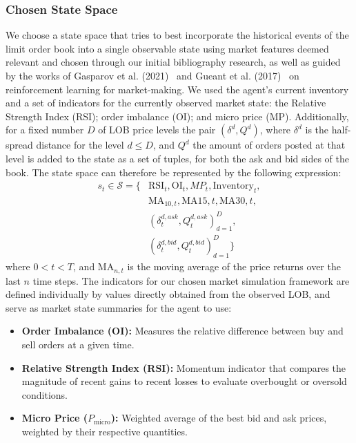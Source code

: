 \subsubsection{Chosen State Space}
We choose a state space that tries to best incorporate the historical events of the limit order book into a single observable state using
market features deemed relevant and chosen through our initial bibliography research,
as well as guided by the works of
Gasparov et al. (2021)~\cite{Gasperov2021} and Gueant et al. (2017)~\cite{Gueant2017} on reinforcement learning for market-making.
We used the agent's current inventory and a set of indicators for the currently observed market state:
the Relative Strength Index (RSI); order imbalance (OI); and micro price (MP).
Additionally, for a fixed number $D$ of LOB price levels the pair $(\delta^d, Q^d)$, where $\delta^d$ is the half-spread distance for the level $d \leq D$,
and $Q^d$ the amount of orders posted at that level is added to the state as a set of tuples, for both the ask and bid sides of the book.
The state space can therefore be represented by the following expression:
\begin{equation*}
    \begin{aligned}
        s_{t} \in \mathcal{S} = \big\{ &\text{RSI}_t, \text{OI}_t, MP_{t}, \text{Inventory}_t, \\
        & \text{MA}_{10, t}, \text{MA}{15, t}, \text{MA}{30, t}, \\
        & (\delta_t^{d, ask}, Q_t^{d, ask})_{d=1}^{D}, \\
        & (\delta_t^{d, bid}, Q_t^{d, bid})_{d=1}^{D} \big\}
    \end{aligned}\label{eq:equation}
\end{equation*}
where $0 < t < T$, and $\text{MA}_{n, t}$ is the moving average of the price returns over the last $n$ time steps.
The indicators for our chosen market simulation framework are defined individually by values directly obtained from the observed LOB,
and serve as market state summaries for the agent to use:

\begin{itemize}
    \item \textbf{Order Imbalance (OI):} Measures the relative difference between buy and sell orders at a given time.
    \item \textbf{Relative Strength Index (RSI):} Momentum indicator that compares the magnitude of recent gains to recent losses to evaluate overbought or oversold conditions.
    \item \textbf{Micro Price (\( P_{\text{micro}} \)):} Weighted average of the best bid and ask prices, weighted by their respective quantities.
\end{itemize}

